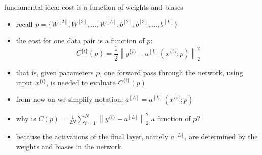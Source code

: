\documentclass[xcolor={svgnames},
               hyperref={colorlinks,citecolor=DeepPink4,linkcolor=FireBrick,urlcolor=Maroon}]
               {beamer}
\begin{document}
\begin{frame}{fundamental idea: cost is a function of weights and biases}

\begin{itemize}
\item recall $p = \{W^{[2]},W^{[3]},\dots,W^{[L]},b^{[2]},b^{[3]},\dots,b^{[L]}\}$
\item the \alert{cost} for one data pair \alert{is a function of} $p$:
    $$C^{\{i\}}(p) = \frac{1}{2} \left\|y^{\{i\}} - a^{[L]}(x^{\{i\}}; p)\right\|_2^2$$
\item that is, given parameters $p$, one forward pass through the network, using input $x^{\{i\}}$, is needed to evaluate $C^{\{i\}}(p)$
\item from now on we simplify notation: \quad $\displaystyle a^{[L]} = a^{[L]}(x^{\{i\}}; p)$

\bigskip\bigskip
\item<2>[\textbf{Q.}] why is $C(p) = \frac{1}{2N} \sum_{i=1}^N \left\|y^{\{i\}} - a^{[L]}\right\|_2^2$ a function of $p$?
\item<2>[\textbf{a.}] because the activations of the final layer, namely $a^{[L]}$, are determined by the weights and biases in the network
\end{itemize}
\end{frame}
\end{document}
